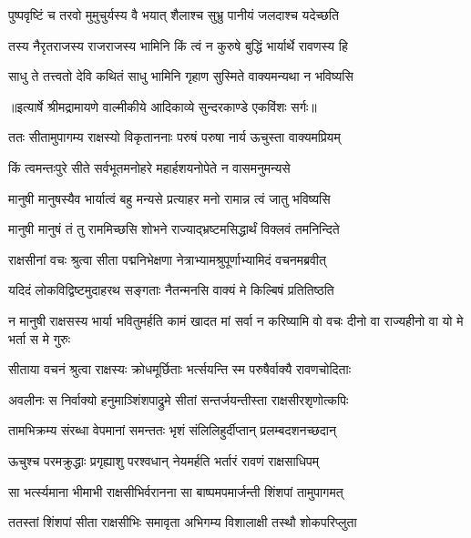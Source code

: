 \twolineshloka
{पुष्पवृष्टिं च तरवो मुमुचुर्यस्य वै भयात्}
{शैलाश्च सुभ्रु पानीयं जलदाश्च यदेच्छति} %

\twolineshloka
{तस्य नैरृतराजस्य राजराजस्य भामिनि}
{किं त्वं न कुरुषे बुद्धिं भार्यार्थे रावणस्य हि} %

\twolineshloka
{साधु ते तत्त्वतो देवि कथितं साधु भामिनि}
{गृहाण सुस्मिते वाक्यमन्यथा न भविष्यसि} %


{॥इत्यार्षे श्रीमद्रामायणे वाल्मीकीये आदिकाव्ये सुन्दरकाण्डे एकविंशः सर्गः॥}


\twolineshloka
{ततः सीतामुपागम्य राक्षस्यो विकृताननाः}
{परुषं परुषा नार्य ऊचुस्ता वाक्यमप्रियम्} %

\twolineshloka
{किं त्वमन्तःपुरे सीते सर्वभूतमनोहरे}
{महार्हशयनोपेते न वासमनुमन्यसे} %

\twolineshloka
{मानुषी मानुषस्यैव भार्यात्वं बहु मन्यसे}
{प्रत्याहर मनो रामान्न त्वं जातु भविष्यसि} %

\twolineshloka
{मानुषी मानुषं तं तु राममिच्छसि शोभने}
{राज्याद्भ्रष्टमसिद्धार्थं विक्लवं तमनिन्दिते} %

\twolineshloka
{राक्षसीनां वचः श्रुत्वा सीता पद्मनिभेक्षणा}
{नेत्राभ्यामश्रुपूर्णाभ्यामिदं वचनमब्रवीत्} %

\twolineshloka
{यदिदं लोकविद्विष्टमुदाहरथ सङ्गताः}
{नैतन्मनसि वाक्यं मे किल्बिषं प्रतितिष्ठति} %

\threelineshloka
{न मानुषी राक्षसस्य भार्या भवितुमर्हति}
{कामं खादत मां सर्वा न करिष्यामि वो वचः}
{दीनो वा राज्यहीनो वा यो मे भर्ता स मे गुरुः} %

\twolineshloka
{सीताया वचनं श्रुत्वा राक्षस्यः क्रोधमूर्छिताः}
{भर्त्सयन्ति स्म परुषैर्वाक्यै रावणचोदिताः} %

\twolineshloka
{अवलीनः स निर्वाक्यो हनुमाञ्शिंशपाद्रुमे}
{सीतां सन्तर्जयन्तीस्ता राक्षसीरशृणोत्कपिः} %

\twolineshloka
{तामभिक्रम्य संरब्धा वेपमानां समन्ततः}
{भृशं संलिलिहुर्दीप्तान् प्रलम्बदशनच्छदान्} %

\twolineshloka
{ऊचुश्च परमक्रुद्धाः प्रगृह्याशु परश्वधान्}
{नेयमर्हति भर्तारं रावणं राक्षसाधिपम्} %

\twolineshloka
{सा भर्त्स्यमाना भीमाभी राक्षसीभिर्वरानना}
{सा बाष्पमपमार्जन्ती शिंशपां तामुपागमत्} %

\twolineshloka
{ततस्तां शिंशपां सीता राक्षसीभिः समावृता}
{अभिगम्य विशालाक्षी तस्थौ शोकपरिप्लुता} %

